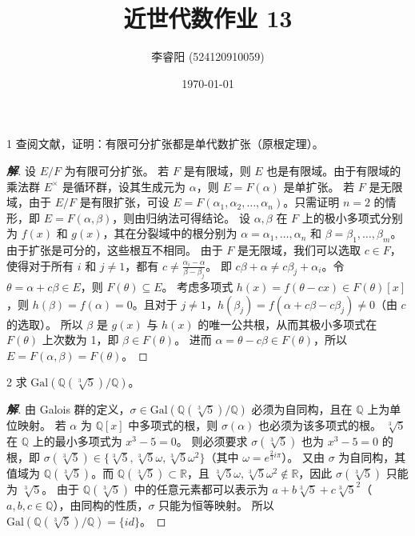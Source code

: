 \documentclass[12pt, a4paper]{article}
\title{近世代数作业 13}
\author{李睿阳 (524120910059)}
\date{\today}
\newenvironment{solution}{
    \begin{proof}[\textbf{解}]
}{
    \end{proof}
}
\begin{document}
\maketitle


\begin{problem}{1}
    查阅文献，证明：有限可分扩张都是单代数扩张（原根定理）。
\end{problem}
\begin{solution}
    设 $E/F$ 为有限可分扩张。
    若 $F$ 是有限域，则 $E$ 也是有限域。由于有限域的乘法群 $E^\times$ 是循环群，设其生成元为 $\alpha$，则 $E = F(\alpha)$ 是单扩张。
    若 $F$ 是无限域，由于 $E/F$ 是有限扩张，可设 $E = F(\alpha_1, \alpha_2, \dots, \alpha_n)$。只需证明 $n=2$ 的情形，即 $E = F(\alpha, \beta)$，则由归纳法可得结论。
    设 $\alpha, \beta$ 在 $F$ 上的极小多项式分别为 $f(x)$ 和 $g(x)$，其在分裂域中的根分别为 $\alpha = \alpha_1, \dots, \alpha_n$ 和 $\beta = \beta_1, \dots, \beta_m$。由于扩张是可分的，这些根互不相同。
    由于 $F$ 是无限域，我们可以选取 $c \in F$，使得对于所有 $i$ 和 $j \neq 1$，都有 $c \neq \frac{\alpha_i - \alpha}{\beta - \beta_j}$。
    即 $c\beta + \alpha \neq c\beta_j + \alpha_i$。令 $\theta = \alpha + c\beta \in E$，则 $F(\theta) \subseteq E$。
    考虑多项式 $h(x) = f(\theta - cx) \in F(\theta)[x]$，则 $h(\beta) = f(\alpha) = 0$。且对于 $j \neq 1$，$h(\beta_j) = f(\alpha + c\beta - c\beta_j) \neq 0$（由 $c$ 的选取）。
    所以 $\beta$ 是 $g(x)$ 与 $h(x)$ 的唯一公共根，从而其极小多项式在 $F(\theta)$ 上次数为 1，即 $\beta \in F(\theta)$。
    进而 $\alpha = \theta - c\beta \in F(\theta)$，所以 $E = F(\alpha, \beta) = F(\theta)$。
\end{solution}


\begin{problem}{2}
    求 $\mathrm{Gal}(\mathbb{Q}(\sqrt[3]{5})/\mathbb{Q})$。
\end{problem}
\begin{solution}
    由 Galois 群的定义，$\sigma \in \mathrm{Gal}(\mathbb{Q}(\sqrt[3]{5})/\mathbb{Q})$ 必须为自同构，且在 $\mathbb{Q}$ 上为单位映射。
    若 $\alpha$ 为 $\mathbb{Q}[x]$ 中多项式的根，则 $\sigma(\alpha)$ 也必须为该多项式的根。
    $\sqrt[3]{5}$ 在 $\mathbb{Q}$ 上的最小多项式为 $x^3-5=0$。
    则必须要求 $\sigma(\sqrt[3]{5})$ 也为 $x^3-5=0$ 的根，即 $\sigma(\sqrt[3]{5}) \in \{\sqrt[3]{5}, \sqrt[3]{5}\omega, \sqrt[3]{5}\omega^2\}$（其中 $\omega=e^{\frac{2}{3}i\pi}$）。
    又由 $\sigma$ 为自同构，其值域为 $\mathbb{Q}(\sqrt[3]{5})$。而 $\mathbb{Q}(\sqrt[3]{5}) \subset \mathbb{R}$，且 $\sqrt[3]{5}\omega, \sqrt[3]{5}\omega^2 \notin \mathbb{R}$，因此 $\sigma(\sqrt[3]{5})$ 只能为 $\sqrt[3]{5}$。
    由于 $\mathbb{Q}(\sqrt[3]{5})$ 中的任意元素都可以表示为 $a+b\sqrt[3]{5}+c\sqrt[3]{5}^2$（$a,b,c \in \mathbb{Q}$），由同构的性质，$\sigma$ 只能为恒等映射。
    所以 $\mathrm{Gal}(\mathbb{Q}(\sqrt[3]{5})/\mathbb{Q}) = \{id\}$。
\end{solution}
\end{document}
